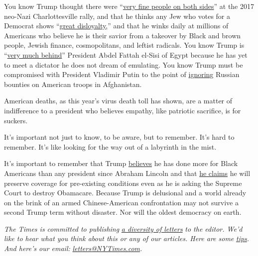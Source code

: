 You know Trump thought there were
``\href{https://www.youtube.com/watch?v=JmaZR8E12bs\&feature=emb_title}{very
fine people on both sides}'' at the 2017 neo-Nazi Charlottesville rally,
and that he thinks any Jew who votes for a Democrat shows
``\href{https://apnews.com/1bc3065eb2e4414289ef0ac1ac4ebaf7}{great
disloyalty,}'' and that he winks daily at millions of Americans who
believe he is their savior from a takeover by Black and brown people,
Jewish finance, cosmopolitans, and leftist radicals. You know Trump is
``\href{https://www.nytimes3xbfgragh.onion/video/us/politics/100000005024000/trump-we-are-very-much-behind-egypt.html}{very
much behind}'' President Abdel Fattah el-Sisi of Egypt because he has
yet to meet a dictator he does not dream of emulating. You know Trump
must be compromised with President Vladimir Putin to the point of
\href{https://www.axios.com/trump-russia-bounties-taliban-putin-call-4a0f6110-ab58-41c0-96fc-57b507462af1.html}{ignoring}
Russian bounties on American troops in Afghanistan.

American deaths, as this year's virus death toll has shown, are a matter
of indifference to a president who believes empathy, like patriotic
sacrifice, is for suckers.

It's important not just to know, to be aware, but to remember. It's hard
to remember. It's like looking for the way out of a labyrinth in the
mist.

It's important to remember that Trump
\href{https://www.washingtonpost.com/politics/2020/06/05/trumps-claim-that-hes-done-more-blacks-than-any-president-since-lincoln/}{believes}
he has done more for Black Americans than any president since Abraham
Lincoln and that
\href{https://apnews.com/5707eb98847a3c69632a2eea2e03a475}{he claims} he
will preserve coverage for pre-existing conditions even as he is asking
the Supreme Court to destroy Obamacare. Because Trump is delusional and
a world already on the brink of an armed Chinese-American confrontation
may not survive a second Trump term without disaster. Nor will the
oldest democracy on earth.

\emph{The Times is committed to publishing}
\href{https://www.nytimes3xbfgragh.onion/2019/01/31/opinion/letters/letters-to-editor-new-york-times-women.html}{\emph{a
diversity of letters}} \emph{to the editor. We'd like to hear what you
think about this or any of our articles. Here are some}
\href{https://help.nytimes3xbfgragh.onion/hc/en-us/articles/115014925288-How-to-submit-a-letter-to-the-editor}{\emph{tips}}\emph{.
And here's our email:}
\href{mailto:letters@NYTimes.com}{\emph{letters@NYTimes.com}}\emph{.}

